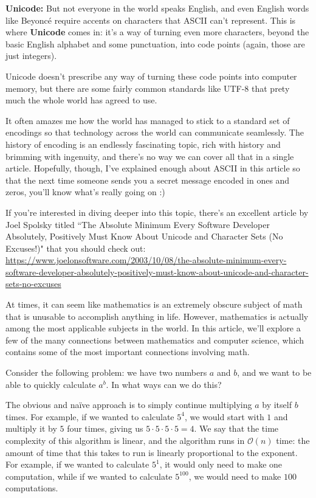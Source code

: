 \documentclass{article}
\begin{document}
\begin{multicols}{3}
\textbf{Unicode:} 
But not everyone in the world speaks English, and even English words like Beyoncé require accents on characters that ASCII can't represent. This is where \textbf{Unicode} comes in: it's a way of turning even more characters, beyond the basic English alphabet and some punctuation, into code points (again, those are just integers).

Unicode doesn't prescribe any way of turning these code points into computer memory, but there are some fairly common standards like UTF-8 that prety much the whole world has agreed to use.

It often amazes me how the world has managed to stick to a standard set of encodings so that technology across the world can communicate seamlessly. The history of encoding is an endlessly fascinating topic, rich with history and brimming with ingenuity, and there's no way we can cover all that in a single article. Hopefully, though, I've explained enough about ASCII in this article so that the next time someone sends you a secret message encoded in ones and zeros, you'll know what's really going on :)

If you're interested in diving deeper into this topic, there's an excellent article by Joel Spolsky titled ``The Absolute Minimum Every Software Developer Absolutely, Positively Must Know About Unicode and Character Sets (No Excuses!)" that you should check out: \url{https://www.joelonsoftware.com/2003/10/08/the-absolute-minimum-every-software-developer-absolutely-positively-must-know-about-unicode-and-character-sets-no-excuses}
\closearticle

At times, it can seem like mathematics is an extremely obscure subject of math that is unusable to accomplish anything in life. However, mathematics is actually among the most applicable subjects in the world. In this article, we'll explore a few of the many connections between mathematics and computer science, which contains some of the most important connections involving math.

Consider the following problem: we have two numbers $a$ and $b$, and we want to be able to quickly calculate $a^b$. In what ways can we do this?

The obvious and na\"{i}ve approach is to simply continue multiplying $a$ by itself $b$ times. For example, if we wanted to calculate $5^4$, we would start with $1$ and multiply it by $5$ four times, giving us $5\cdot 5\cdot 5\cdot 5=4$. We say that the time complexity of this algorithm is linear, and the algorithm runs in $\mathcal{O}(n)$ time: the amount of time that this takes to run is linearly proportional to the exponent. For example, if we wanted to calculate $5^1$, it would only need to make one computation, while if we wanted to calculate $5^{100}$, we would need to make $100$ computations.


\end{multicols}
\end{document}
